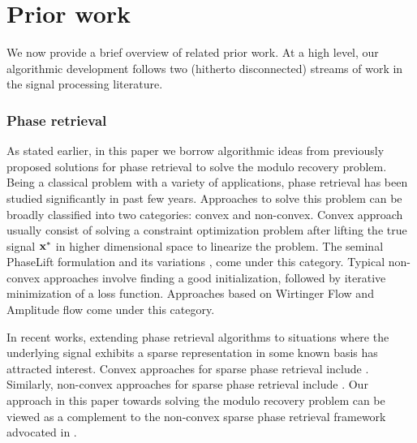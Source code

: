 \section{Prior work}
\label{sec:prior}

We now provide a brief overview of related prior work. At a high level, our algorithmic development follows two (hitherto disconnected) streams of work in the signal processing literature.

\subsubsection*{Phase retrieval} As stated earlier, in this paper we borrow algorithmic ideas from previously proposed solutions for phase retrieval to solve the modulo recovery problem. Being a classical problem with a variety of applications, phase retrieval has been studied significantly in past few years. Approaches to solve this problem can be broadly classified into two categories: convex and non-convex. 
Convex approach usually consist of solving a constraint optimization problem after lifting the true signal $\mathbf{x^*}$ in higher dimensional space to linearize the problem. The seminal PhaseLift formulation \cite{candes2013phaselift} and its variations \cite{gross2017improved}, \cite{candes2015phasediff} come under this category. Typical non-convex approaches involve finding a good initialization, followed by iterative minimization of a loss function. Approaches based on Wirtinger Flow \cite{candes2015phase, zhang2016reshaped,  chen2015solving, cai2016optimal} and Amplitude flow \cite{wang2016sparse,wang2016solving} come under this category. 

In recent works, extending phase retrieval algorithms to situations where the underlying signal exhibits a sparse representation in some known basis has attracted interest. Convex approaches for sparse phase retrieval include \cite{ohlsson2012cprl, li2013sparse,bahmani2015efficient,jaganathan2012recovery}. Similarly, non-convex approaches for sparse phase retrieval include \cite{netrapalli2013phase, cai2016optimal, wang2016sparse}. Our approach in this paper towards solving the modulo recovery problem can be viewed as a complement to the non-convex sparse phase retrieval framework advocated in \cite{Jagatap2017}. 

